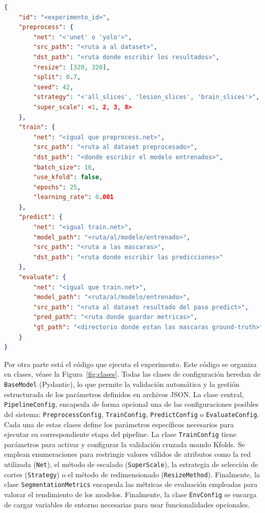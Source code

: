 \documentclass[../main.tex]{subfiles}
\begin{document}
\begin{lstlisting}[language=json, caption={Plantilla de archivo de configuración JSON.}]
{
    "id": "<experimento_id>",
    "preprocess": {
        "net": "<'unet' o 'yolo'>",
        "src_path": "<ruta a al dataset>",
        "dst_path": "<ruta donde escribir los resultados>",
        "resize": [320, 320],
        "split": 0.7,
        "seed": 42,
        "strategy": "<'all_slices', 'lesion_slices', 'brain_slices'>",
        "super_scale": <1, 2, 3, 8>
    },
    "train": {
        "net": "<igual que preprocess.net>",
        "src_path": "<ruta al dataset preprocesado>",
        "dst_path": "<donde escribir el modelo entrenados>",
        "batch_size": 16,
        "use_kfold": false,
        "epochs": 25,
        "learning_rate": 0.001
    },
    "predict": {
        "net": "<igual train.net>",
        "model_path": "<ruta/al/modelo/entrenado>",
        "src_path": "<ruta a las mascaras>",
        "dst_path": "<ruta donde escribir las predicciones>"
    },
    "evaluate": {
        "net": "<igual que train.net>",
        "model_path": "<ruta/al/modelo/entrenado>",
        "src_path": "<ruta al dataset resultado del paso predict>",
        "pred_path": "<ruta donde guardar metricas>",
        "gt_path": "<directorio donde estan las mascaras ground-truth>"
    }
}
\end{lstlisting}

Por otra parte está el código que ejecuta el experimento. Este código se organiza en clases, véase la Figura~\ref{fig:clases}. Todas las clases de configuración heredan de \texttt{BaseModel} (Pydantic), lo que permite la validación automática y la gestión estructurada de los parámetros definidos en archivos JSON. La clase central, \texttt{PipelineConfig}, encapsula de forma opcional una de las configuraciones posibles del sistema: \texttt{PreprocessConfig}, \texttt{TrainConfig}, \texttt{PredictConfig} o \texttt{EvaluateConfig}. Cada una de estas clases define los parámetros específicos necesarios para ejecutar su correspondiente etapa del pipeline. La clase \texttt{TrainConfig} tiene parámetros para activar y configurar la validación cruzada usando Kfolds. Se emplean enumeraciones para restringir valores válidos de atributos como la red utilizada (\texttt{Net}), el método de escalado (\texttt{SuperScale}), la estrategia de selección de cortes (\texttt{Strategy}) o el método de redimensionado (\texttt{ResizeMethod}). Finalmente, la clase \texttt{SegmentationMetrics} encapsula las métricas de evaluación empleadas para valorar el rendimiento de los modelos. Finalmente, la clase \texttt{EnvConfig} se encarga de cargar variables de entorno necesarias para usar funcionalidades opcionales. %
\end{document}
